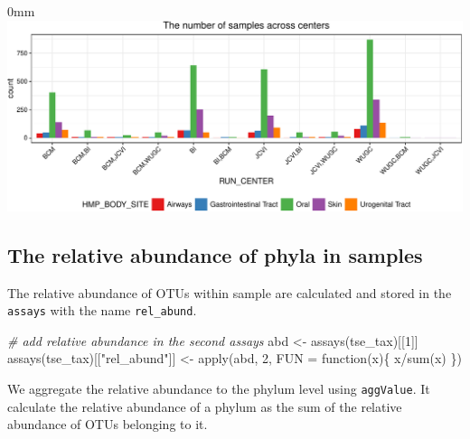 \documentclass[]{article}
\newcommand{\hlnum}[1]{\textcolor[rgb]{0.816,0.125,0.439}{#1}}%
\newcommand{\hlstr}[1]{\textcolor[rgb]{0.251,0.627,0.251}{#1}}%
\newcommand{\hlcom}[1]{\textcolor[rgb]{0.502,0.502,0.502}{\textit{#1}}}%
\newcommand{\hlopt}[1]{\textcolor[rgb]{0,0,0}{#1}}%
\newcommand{\hlstd}[1]{\textcolor[rgb]{0.251,0.251,0.251}{#1}}%
\newcommand{\hlkwc}[1]{\textcolor[rgb]{0.251,0.251,0.251}{#1}}%
\newcommand{\hlkwd}[1]{\textcolor[rgb]{0.878,0.439,0.125}{#1}}%
\newenvironment{Shaded}{\begin{myshaded}}{\end{myshaded}}
\newcommand{\KeywordTok}[1]{\hlkwd{#1}}
\newcommand{\DataTypeTok}[1]{\hlkwc{#1}}
\newcommand{\DecValTok}[1]{\hlnum{#1}}
\newcommand{\StringTok}[1]{\hlstr{#1}}
\newcommand{\CommentTok}[1]{\hlcom{#1}}
\newcommand{\OtherTok}[1]{{#1}}
\newcommand{\ControlFlowTok}[1]{\hlkwd{#1}}
\newcommand{\OperatorTok}[1]{\hlopt{#1}}
\newcommand{\NormalTok}[1]{\hlstd{#1}}
\begin{document}
\begin{adjustwidth}{\fltoffset}{0mm}
\includegraphics{figure/unnamed-chunk-52-1} \end{adjustwidth}

\hypertarget{the-relative-abundance-of-phyla-in-samples}{%
\subsection{The relative abundance of phyla in samples}\label{the-relative-abundance-of-phyla-in-samples}}

The relative abundance of OTUs within sample are calculated and stored in the \texttt{assays} with the name \texttt{rel\_abund}.

\begin{Shaded}
\begin{Highlighting}[]
\CommentTok{# add relative abundance in the second assays}
\NormalTok{abd <-}\StringTok{ }\KeywordTok{assays}\NormalTok{(tse_tax)[[}\DecValTok{1}\NormalTok{]]}
\KeywordTok{assays}\NormalTok{(tse_tax)[[}\StringTok{"rel_abund"}\NormalTok{]] <-}\StringTok{ }\KeywordTok{apply}\NormalTok{(abd, }\DecValTok{2}\NormalTok{, }\DataTypeTok{FUN =} \ControlFlowTok{function}\NormalTok{(x)\{}
\NormalTok{  x}\OperatorTok{/}\KeywordTok{sum}\NormalTok{(x)}
\NormalTok{\})}
\end{Highlighting}
\end{Shaded}

We aggregate the relative abundance to the phylum level using \texttt{aggValue}. It calculate the relative abundance of a phylum as the sum of the relative abundance of OTUs belonging to it.

\begin{Shaded}
\end{Shaded}
\end{document}
